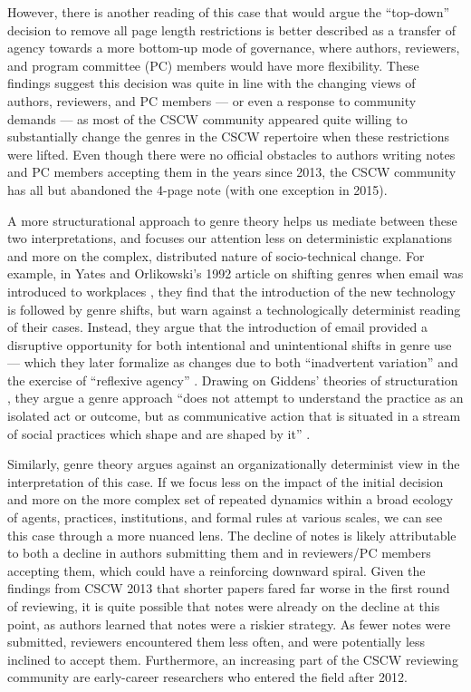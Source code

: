 \documentclass[format=acmsmall, screen=true]{acmart}
\begin{document}
However, there is another reading of this case that would argue the ``top-down'' decision to remove all page length restrictions is better described as a transfer of agency towards a more bottom-up mode of governance, where authors, reviewers, and program committee (PC) members would have more flexibility. These findings suggest this decision was quite in line with the changing views of authors, reviewers, and PC members --- or even a response to community demands --- as most of the CSCW community appeared quite willing to substantially change the genres in the CSCW repertoire when these restrictions were lifted. Even though there were no official obstacles to authors writing notes and PC members accepting them in the years since 2013, the CSCW community has all but abandoned the 4-page note (with one exception in 2015). 

A more structurational approach to genre theory helps us mediate between these two interpretations, and focuses our attention less on deterministic explanations and more on the complex, distributed nature of socio-technical change. For example, in Yates and Orlikowski's 1992 article on shifting genres when email was introduced to workplaces \cite{yates1992}, they find that the introduction of the new technology is followed by genre shifts, but warn against a technologically determinist reading of their cases. Instead, they argue that the introduction of email provided a disruptive opportunity for both intentional and unintentional shifts in genre use --- which they later formalize as changes due to both ``inadvertent variation'' and the exercise of ``reflexive agency'' \cite{orlikowski_genre_1994}. Drawing on Giddens' theories of structuration \cite{anthony1984constitution}, they argue a genre approach ``does not attempt to understand the practice as an isolated act or outcome, but as communicative action that is situated in a stream of social practices which shape and are shaped by it'' \cite[p. 318]{yates1992}.

Similarly, genre theory argues against an organizationally determinist view in the interpretation of this case. If we focus less on the impact of the initial decision and more on the more complex set of repeated dynamics within a broad ecology of agents, practices, institutions, and formal rules at various scales, we can see this case through a more nuanced lens. The decline of notes is likely attributable to both a decline in authors submitting them and in reviewers/PC members accepting them, which could have a reinforcing downward spiral. Given the findings from CSCW 2013 \cite{terveen_process_2013} that shorter papers fared far worse in the first round of reviewing, it is quite possible that notes were already on the decline at this point, as authors learned that notes were a riskier strategy. As fewer notes were submitted, reviewers encountered them less often, and were potentially less inclined to accept them. Furthermore, an increasing part of the CSCW reviewing community are early-career researchers who entered the field after 2012.
\end{document}
